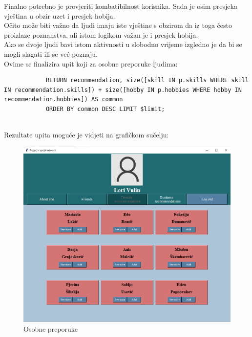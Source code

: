 \documentclass[titlepage, 12pt]{scrartcl}
\begin{document}
	Finalno potrebno je provjeriti kombatibilnost korisnika. Sada je osim presjeka vještina u obzir uzet i presjek hobija. \\
	Očito može biti važno da ljudi imaju iste vještine s obzirom da iz toga često proizlaze poznanstva, ali istom logikom važan je i presjek hobija. \\
	Ako se dvoje ljudi bavi istom aktivnosti u slobodno vrijeme izgledno je da bi se mogli slagati ili se već poznaju. \\
	Ovime se finalizira upit koji za osobne preporuke ljudima:
	\begin{samepage}
		\begin{verbatim}
			RETURN recommendation, size([skill IN p.skills WHERE skill IN recommendation.skills]) + size([hobby IN p.hobbies WHERE hobby IN recommendation.hobbies]) AS common 
			ORDER BY common DESC LIMIT $limit;
			
		\end{verbatim}
	\end{samepage}
	\newpage
	\begin{samepage}
		Rezultate upita moguće je vidjeti na grafičkom sučelju:
		\begin{figure}[h]
			\centering
			\includegraphics[scale=0.55]{slike/personal.jpg}
			\caption{Osobne preporuke}
			\label{fig:personal_rec}
		\end{figure}
	\end{samepage}
	
\end{document}
